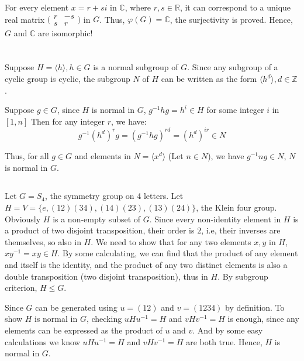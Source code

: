 \documentclass[12pt]{article}
\begin{document}
For every element $x=r+si$ in $\mathbb{C}$, where $r,s\in\mathbb{R}$, it can correspond to a unique real matrix $\big(\begin{smallmatrix} r& -s\\s & r\end{smallmatrix}\big)$ in $G$. Thus, $\varphi(G)=\mathbb{C}$, the surjectivity is proved. Hence, $G$ and $\mathbb{C}$ are isomorphic!

\newpage
\section{} %
\subsection{}
Suppose $H=\langle h\rangle,h\in G$ is a normal subgroup of $G$. Since any subgroup of a cyclic group is cyclic, the subgroup $N$ of $H$ can be written as the form $\langle h^d\rangle,d\in \mathbb{Z}$.

Suppose $g\in G$, since $H$ is normal in $G$, $g^{-1}hg=h^{i}\in H$ for some integer $i$ in $[1,n]$ Then for any integer $r$, we have:
$$g^{-1}(h^{d})^rg=(g^{-1}hg)^{rd}=(h^d)^{ir}\in N$$

Thus, for all $g\in G$ and elements in $N=\langle x^d\rangle$ (Let $n\in N$), we have $g^{-1}ng\in N$, $N$ is normal in $G$. 
\subsection{}
Let $G=S_4$, the symmetry group on 4 letters. Let $H=V=\{e,(12)(34),(14)(23),(13)(24)\}$, the Klein four group. Obviously $H$ is a non-empty subset of $G$. Since every non-identity element in $H$ is a product of two disjoint transposition, their order is $2$, i.e, their inverses are themselves, so also in $H$. We need to show that for any two elements $x,y$ in $H$, $xy^{-1}=xy\in H$. By some calculating, we can find that the product of any element and itself is the identity, and the product of any two distinct elements is also a double transposition (two disjoint transposition), thus in $H$. By subgroup criterion, $H\le G$.

Since $G$ can be generated using $u=(12)$ and $v=(1234)$ by definition. To show $H$ is normal in $G$, checking $uHu^{-1}=H$ and $vHv^{-1}=H$ is enough, since any elements can be expressed as the product of $u$ and $v$. And by some easy calculations we know $uHu^{-1}=H$ and $vHv^{-1}=H$ are both true. Hence, $H$ is normal in $G$.
\end{document}

